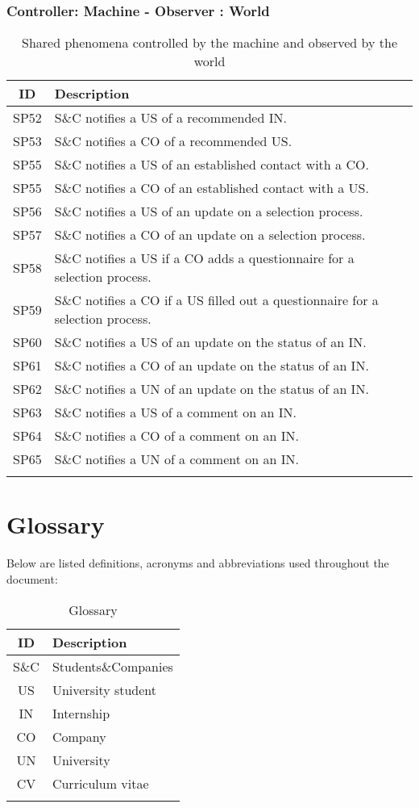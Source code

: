 \subsubsection{Controller: Machine - Observer : World}
\renewcommand{\arraystretch}{1.5}
\begin{longtable}{|c|p{10.5cm}|}
    \hline \rowcolor{polimiblue!40}
    \textbf{ID} & \textbf{Description} \\ \hline
    SP52 & S\&C notifies a US of a recommended IN. \\ \hline
    SP53 & S\&C notifies a CO of a recommended US. \\ \hline
    SP55 & S\&C notifies a US of an established contact with a CO. \\ \hline
    SP55 & S\&C notifies a CO of an established contact with a US. \\ \hline
    SP56 & S\&C notifies a US of an update on a selection process. \\ \hline
    SP57 & S\&C notifies a CO of an update on a selection process. \\ \hline
    SP58 & S\&C notifies a US if a CO adds a questionnaire for a selection process. \\ \hline
    SP59 & S\&C notifies a CO if a US filled out a questionnaire for a selection process. \\ \hline
    SP60 & S\&C notifies a US of an update on the status of an IN. \\ \hline
    SP61 & S\&C notifies a CO of an update on the status of an IN. \\ \hline
    SP62 & S\&C notifies a UN of an update on the status of an IN. \\ \hline
    SP63 & S\&C notifies a US of a comment on an IN. \\ \hline
    SP64 & S\&C notifies a CO of a comment on an IN. \\ \hline
    SP65 & S\&C notifies a UN of a comment on an IN. \\ \hline
\caption{Shared phenomena controlled by the machine and observed by the world}
\end{longtable}

\section{Glossary}
Below are listed definitions, acronyms and abbreviations used throughout the document:

\renewcommand{\arraystretch}{1.5}
\begin{longtable}{|c|p{8.5cm}|}
    \hline \rowcolor{polimiblue!40}
    \textbf{ID} & \textbf{Description} \\ \hline
    S\&C & Students\&Companies \\ \hline
    US & University student \\ \hline
    IN & Internship \\ \hline
    CO & Company \\ \hline
    UN & University \\ \hline
    CV & Curriculum vitae \\ \hline
\caption{Glossary}
\end{longtable}

